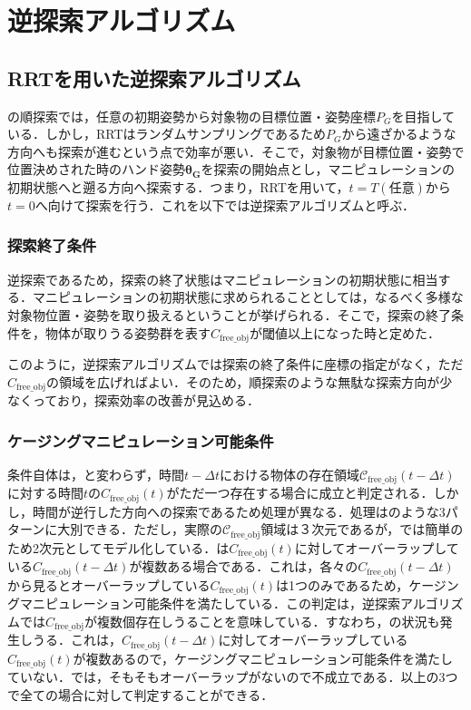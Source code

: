 \documentclass[a4paper,twoside,12pt,papersize, dvipdfmx]{iirthesis}
\begin{document}
{\section{逆探索アルゴリズム}\label{sec::planner::reverse}
\subsection{RRTを用いた逆探索アルゴリズム}
の順探索では，任意の初期姿勢から対象物の目標位置・姿勢座標$P_G$を目指している．しかし，RRTはランダムサンプリングであるため$P_G$から遠ざかるような方向へも探索が進むという点で効率が悪い．そこで，対象物が目標位置・姿勢で位置決めされた時のハンド姿勢$\bm{\theta_G}$を探索の開始点とし，マニピュレーションの初期状態へと遡る方向へ探索する．つまり，RRTを用いて，$t=T (任意)$から$t=0$へ向けて探索を行う．これを以下では逆探索アルゴリズムと呼ぶ．

\subsubsection{探索終了条件}
逆探索であるため，探索の終了状態はマニピュレーションの初期状態に相当する．マニピュレーションの初期状態に求められることとしては，なるべく多様な対象物位置・姿勢を取り扱えるということが挙げられる．そこで，探索の終了条件を，物体が取りうる姿勢群を表す$C_{\mathrm{free\_obj}}$が閾値以上になった時と定めた．\par
このように，逆探索アルゴリズムでは探索の終了条件に座標の指定がなく，ただ$C_{\mathrm{free\_obj}}$の領域を広げればよい．そのため，順探索のような無駄な探索方向が少なくっており，探索効率の改善が見込める．

\subsubsection{ケージングマニピュレーション可能条件}\label{subsec::planner::revcm}
条件自体は，と変わらず，時間$t-\Delta t$における物体の存在領域$\mathcal{C}_{\mathrm{free\_obj}}(t-\Delta t)$に対する時間$t$の$C_{\mathrm{free\_obj}}(t)$がただ一つ存在する場合に成立と判定される．しかし，時間が逆行した方向への探索であるため処理が異なる．処理はのような3パターンに大別できる．ただし，実際の$\mathcal{C}_{\mathrm{free\_obj}}$領域は３次元であるが，では簡単のため2次元としてモデル化している．は$C_{\mathrm{free\_obj}}(t)$に対してオーバーラップしている$C_{\mathrm{free\_obj}}(t-\Delta t)$が複数ある場合である．これは，各々の$C_{\mathrm{free\_obj}}(t-\Delta t)$から見るとオーバーラップしている$C_{\mathrm{free\_obj}}(t)$は1つのみであるため，ケージングマニピュレーション可能条件を満たしている．この判定は，逆探索アルゴリズムでは$C_{\mathrm{free\_obj}}$が複数個存在しうることを意味している．すなわち，の状況も発生しうる．これは，$C_{\mathrm{free\_obj}}(t-\Delta t)$に対してオーバーラップしている$C_{\mathrm{free\_obj}}(t)$が複数あるので，ケージングマニピュレーション可能条件を満たしていない．では，そもそもオーバーラップがないので不成立である．以上の3つで全ての場合に対して判定することができる．

}
\end{document}
